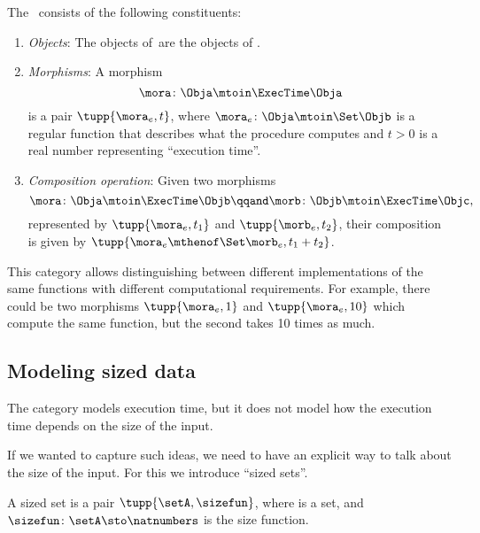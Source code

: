 \begin{definition}
    \label{def:ExecTime}
    The ~\ExecTime consists of the following constituents:
    \begin{enumerate}
        \item \emph{Objects}: The objects of~\ExecTime are the objects of \Set.
        \item \emph{Morphisms}: A morphism
              \begin{equation}
                  \mora \colon \Obja \mtoin\ExecTime \Obja
              \end{equation}
              is a pair $\tupp{\mora_e, t}$, where $\mora_e \colon \Obja \mtoin\Set \Objb$ is a regular function that describes what the procedure computes and $t>0$ is a real number representing ``execution time''.
        \item \emph{Composition operation}: Given two morphisms
              \begin{equation}
                  \mora \colon  \Obja\mtoin\ExecTime \Objb \qqand
                  \morb \colon  \Objb\mtoin\ExecTime \Objc,
              \end{equation}
              represented by $\tupp{\mora_e, t_1}$ and $\tupp{\morb_e, t_2}$, their composition is given by $\tupp{\mora_e\mthenof\Set\morb_e, t_1 + t_2 }$.
    \end{enumerate}
\end{definition}

This category allows distinguishing between different implementations of the same functions with different computational requirements.
For example, there could be two morphisms  $\tupp{\mora_e, 1}$  and  $\tupp{\mora_e, 10}$ which compute the same function, but the second takes 10 times as much.

\subsection{Modeling sized data}

The category \ExecTime models execution time, but it does not model how the execution time depends on the size of the input.

If we wanted to capture such ideas, we need to have an explicit way to talk about the size of the input.
%
For this we introduce ``sized sets''.

\begin{definition}
    \label{def:sized-set}
    A sized set is a pair $\tupp{\setA, \sizefun}$, where \setA is a set, and
    $\sizefun \colon \setA \sto \natnumbers$ is the size function.
\end{definition}

